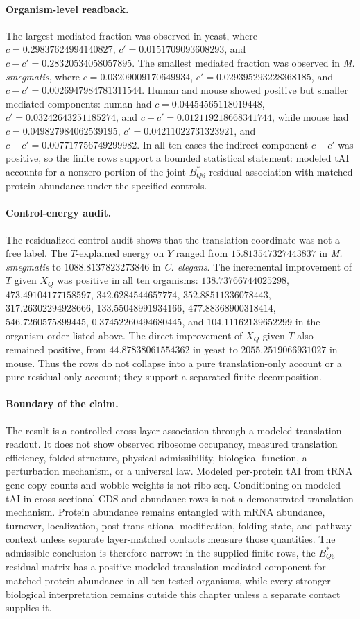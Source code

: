 \paragraph{Organism-level readback.}
The largest mediated fraction was observed in yeast, where $c=0.29837624994140827$, $c'=0.0151709093608293$, and $c-c'=0.28320534058057895$. The smallest mediated fraction was observed in \emph{M. smegmatis}, where $c=0.03209009170649934$, $c'=0.029395293228368185$, and $c-c'=0.0026947984781311544$. Human and mouse showed positive but smaller mediated components: human had $c=0.04454565118019448$, $c'=0.03242643251185274$, and $c-c'=0.012119218668341744$, while mouse had $c=0.049827984062539195$, $c'=0.04211022731323921$, and $c-c'=0.007717756749299982$. In all ten cases the indirect component $c-c'$ was positive, so the finite rows support a bounded statistical statement: modeled tAI accounts for a nonzero portion of the joint $B^{*}_{Q6}$ residual association with matched protein abundance under the specified controls.

\paragraph{Control-energy audit.}
The residualized control audit shows that the translation coordinate was not a free label. The $T$-explained energy on $Y$ ranged from $15.813547327443837$ in \emph{M. smegmatis} to $1088.8137823273846$ in \emph{C. elegans}. The incremental improvement of $T$ given $X_Q$ was positive in all ten organisms: $138.73766744025298$, $473.49104177158597$, $342.6284544657774$, $352.88511336078443$, $317.26302294928666$, $133.55048991934166$, $477.88368900318414$, $546.7260575899445$, $0.37452260494680445$, and $104.11162139652299$ in the organism order listed above. The direct improvement of $X_Q$ given $T$ also remained positive, from $44.87838061554362$ in yeast to $2055.2519066931027$ in mouse. Thus the rows do not collapse into a pure translation-only account or a pure residual-only account; they support a separated finite decomposition.

\paragraph{Boundary of the claim.}
The result is a controlled cross-layer association through a modeled translation readout. It does not show observed ribosome occupancy, measured translation efficiency, folded structure, physical admissibility, biological function, a perturbation mechanism, or a universal law. Modeled per-protein tAI from tRNA gene-copy counts and wobble weights is not ribo-seq. Conditioning on modeled tAI in cross-sectional CDS and abundance rows is not a demonstrated translation mechanism. Protein abundance remains entangled with mRNA abundance, turnover, localization, post-translational modification, folding state, and pathway context unless separate layer-matched contacts measure those quantities. The admissible conclusion is therefore narrow: in the supplied finite rows, the $B^{*}_{Q6}$ residual matrix has a positive modeled-translation-mediated component for matched protein abundance in all ten tested organisms, while every stronger biological interpretation remains outside this chapter unless a separate contact supplies it.
